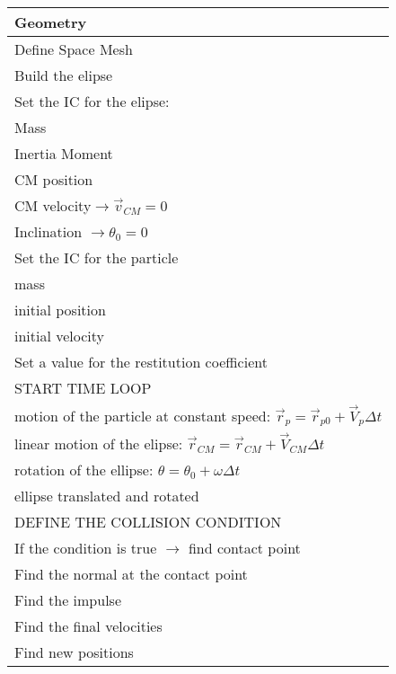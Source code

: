 \documentclass[12pt]{article}
\begin{document}
\begin{center}
\begin{tabular}{ l  }
\hline
Geometry\\ 
 \hline
Define Space Mesh\\
 Build the elipse\\
 \hline
 Set the IC for the elipse:\\
  \hline

 Mass\\
 Inertia Moment\\
  CM position\\
 CM velocity$\rightarrow\vec{v}_{CM}=0$\\
 Inclination $\rightarrow\theta_0=0$\\
 \hline

 Set the IC for the particle\\
 \hline

 mass\\
  initial position\\
 initial velocity\\
 \hline

 Set a value for the restitution coefficient\\
  \hline

 START TIME LOOP\\
 \hline

 motion of the particle at constant speed: $\vec{r}_p=\vec{r}_{p0}+\vec{V}_p\Delta t$\\
  linear motion of the elipse: $\vec{r}_{CM}=\vec{r}_{CM}+\vec{V}_{CM}\Delta t$\\
 rotation of the ellipse: $\theta=\theta_0+\omega\Delta t$\\
ellipse translated and rotated\\
 \hline

 DEFINE THE COLLISION CONDITION\\
  \hline

 If the condition is true $\rightarrow$ find contact point\\
  \hline

 Find the normal at the contact point\\
 Find the impulse\\
 Find the final velocities\\
 Find new positions\\
  \hline

\end{tabular}
\end{center}
\end{document}
